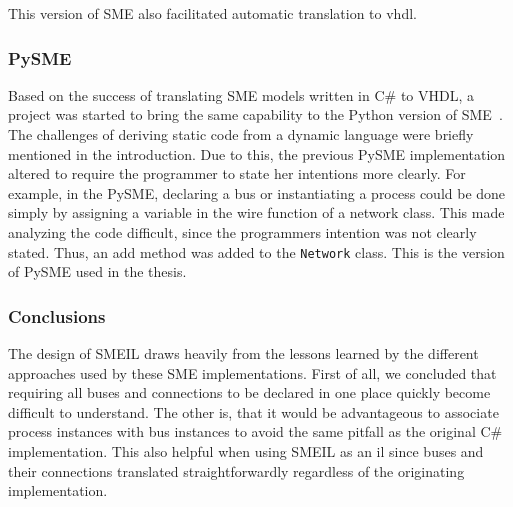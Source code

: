 This version of SME also facilitated automatic translation to \gls{vhdl}.

\subsubsection{ PySME}
Based on the success of translating SME models written in C\# to VHDL, a project
was started to bring the same capability to the Python version of
SME~\cite{asheim2016vhdl}. The challenges of deriving static code from a dynamic
language were briefly mentioned in the introduction. Due to this, the previous
PySME implementation altered to require the programmer to state her intentions
more clearly. For example, in the  PySME, declaring a bus or
instantiating a process could be done simply by assigning a variable in the
{\ttfamily wire} function of a network class. This made analyzing the code
difficult, since the programmers intention was not clearly stated. Thus, an
{\ttfamily add} method was added to the \texttt{Network} class. This is the
version of PySME used in the thesis.

\subsubsection{Conclusions}
The design of SMEIL draws heavily from the lessons learned by the different
approaches used by these SME implementations. 
First of all, we concluded that requiring all buses and connections to be
declared in one place quickly become difficult to understand. The other is, that
it would be advantageous to associate process instances with bus instances to
avoid the same pitfall as the original C\# implementation. This also helpful
when using SMEIL as an \gls{il} since buses and their connections translated
straightforwardly regardless of the originating implementation.



